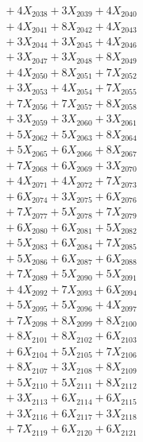 \documentclass[a4paper,10pt]{article}
\begin{document}
{\begin{align}
&\;  + 4 X_{2038} + 3 X_{2039} + 4 X_{2040} \\[0.3ex]
&\;  + 4 X_{2041} + 8 X_{2042} + 4 X_{2043} \\[0.3ex]
&\;  + 3 X_{2044} + 3 X_{2045} + 4 X_{2046} \\[0.3ex]
&\;  + 3 X_{2047} + 3 X_{2048} + 8 X_{2049} \\[0.5ex]\allowbreak
&\;  + 4 X_{2050} + 8 X_{2051} + 7 X_{2052} \\[0.3ex]
&\;  + 3 X_{2053} + 4 X_{2054} + 7 X_{2055} \\[0.3ex]
&\;  + 7 X_{2056} + 7 X_{2057} + 8 X_{2058} \\[0.3ex]
&\;  + 3 X_{2059} + 3 X_{2060} + 3 X_{2061} \\[0.3ex]
&\;  + 5 X_{2062} + 5 X_{2063} + 8 X_{2064} \\[0.3ex]
&\;  + 5 X_{2065} + 6 X_{2066} + 8 X_{2067} \\[0.3ex]
&\;  + 7 X_{2068} + 6 X_{2069} + 3 X_{2070} \\[0.3ex]
&\;  + 4 X_{2071} + 4 X_{2072} + 7 X_{2073} \\[0.3ex]
&\;  + 6 X_{2074} + 3 X_{2075} + 6 X_{2076} \\[0.3ex]
&\;  + 7 X_{2077} + 5 X_{2078} + 7 X_{2079} \\[0.5ex]\allowbreak
&\;  + 6 X_{2080} + 6 X_{2081} + 5 X_{2082} \\[0.3ex]
&\;  + 5 X_{2083} + 6 X_{2084} + 7 X_{2085} \\[0.3ex]
&\;  + 5 X_{2086} + 6 X_{2087} + 6 X_{2088} \\[0.3ex]
&\;  + 7 X_{2089} + 5 X_{2090} + 5 X_{2091} \\[0.3ex]
&\;  + 4 X_{2092} + 7 X_{2093} + 6 X_{2094} \\[0.3ex]
&\;  + 5 X_{2095} + 5 X_{2096} + 4 X_{2097} \\[0.3ex]
&\;  + 7 X_{2098} + 8 X_{2099} + 8 X_{2100} \\[0.3ex]
&\;  + 8 X_{2101} + 8 X_{2102} + 6 X_{2103} \\[0.3ex]
&\;  + 6 X_{2104} + 5 X_{2105} + 7 X_{2106} \\[0.3ex]
&\;  + 8 X_{2107} + 3 X_{2108} + 8 X_{2109} \\[0.5ex]\allowbreak
&\;  + 5 X_{2110} + 5 X_{2111} + 8 X_{2112} \\[0.3ex]
&\;  + 3 X_{2113} + 6 X_{2114} + 6 X_{2115} \\[0.3ex]
&\;  + 3 X_{2116} + 6 X_{2117} + 3 X_{2118} \\[0.3ex]
&\;  + 7 X_{2119} + 6 X_{2120} + 6 X_{2121} \\[0.3ex]

\end{align}}
\end{document}
